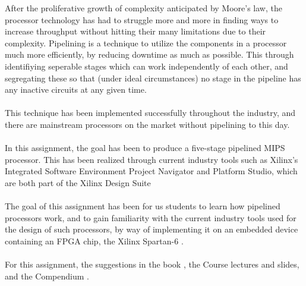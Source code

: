 After the proliferative growth of complexity anticipated by Moore's law, the
processor technology has had to struggle more and more in finding ways to
increase throughput without hitting their many limitations due to their
complexity. Pipelining is a technique to utilize the components in a processor
much more efficiently, by reducing downtime as much as possible. This through
identifiying seperable stages which can work independently of each other, and
segregating these so that (under ideal circumstances) no stage in the pipeline
has any inactive circuits at any given time.
\paragraph*{}
This technique has been implemented successfully throughout the industry, and
there are mainstream processors on the market without pipelining to this day.
\paragraph*{}
In this assignment, the goal has been to produce a five-stage pipelined MIPS
processor. This has been realized through current industry tools such as
Xilinx's Integrated Software Environment Project Navigator and Platform Studio,
which are both part of the Xilinx Design Suite \cite{xilinx-ise}
\paragraph*{}
The goal of this assignment has been for us students to learn how pipelined
processors work, and to gain familiarity with the current industry tools used
for the design of such processors, by way of implementing it on an embedded
device containing an FPGA chip, the Xilinx Spartan-6 \cite{spartan-6}.
\paragraph*{}
For this assignment, the suggestions in the book \cite{patterson12}, the Course
\cite{course} lectures and slides, and the Compendium \cite{compendium}.